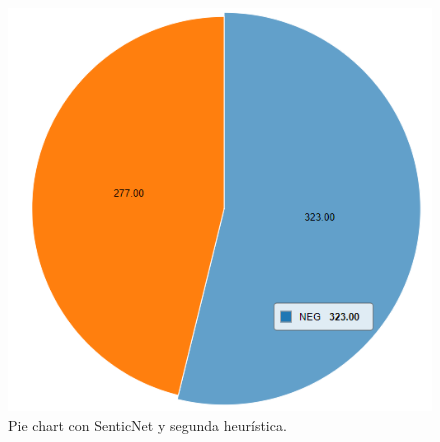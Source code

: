 \begin{figure}[H]
    \center\includegraphics[height=.4\linewidth]{img/analysis/pie3-2.png}
    \caption{Pie chart con SenticNet y segunda heurística.}
\end{figure}